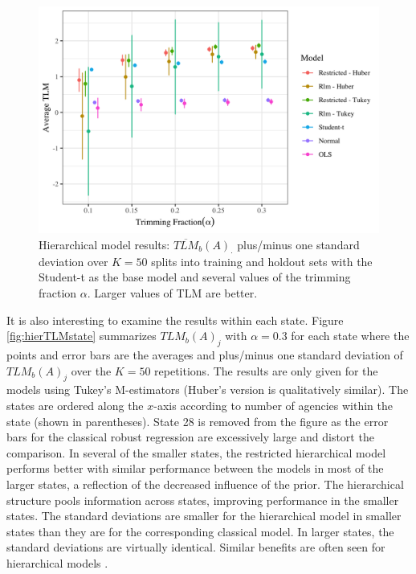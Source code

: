 \documentclass[ba]{imsart}
\begin{document}
\begin{figure}[t]
\centering
\includegraphics[width=6in]{hier_average_tlm.png}
\caption{Hierarchical model results: $\overline{TLM}_b(A)_{\cdot}$  plus/minus one standard deviation over $K = 50$ splits into training and holdout sets with the Student-t as the base model and several values of the trimming fraction $\alpha$. Larger values of TLM are better.}
\label{fig:hierTLM}
\end{figure}


It is also interesting to examine the results within each state. Figure \ref{fig:hierTLMstate} summarizes ${TLM}_b(A)_{j}$ with $\alpha = 0.3$ for each state where the points and error bars are the averages and plus/minus one standard deviation of ${TLM}_b(A)_{j}$ over the $K = 50$ repetitions. The results are only given for the models using Tukey's M-estimators (Huber's version is qualitatively similar). The states are ordered along the $x$-axis according to number of agencies within the state (shown in parentheses). State 28 is removed from the figure as the error bars for the classical robust regression are excessively large and distort the comparison.  In several of the smaller states, the restricted hierarchical model performs better with similar performance between the models in most of the larger states, a reflection of the decreased influence of the prior.  The hierarchical structure pools information across states, improving performance in the smaller states. The standard deviations are smaller for the hierarchical model in smaller states than they are for the corresponding classical model.  In larger states, the standard deviations are virtually identical. Similar benefits are often seen for hierarchical models \citep[e.g.,][]{gelman2006}. 
\end{document}
